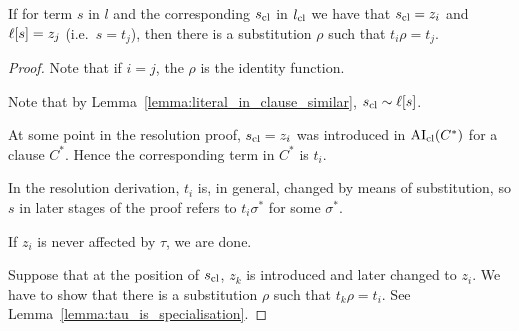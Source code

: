 \documentclass[,%
	paper=a4,%
	DIV12, %
	twoside=false,%
	liststotoc,
	bibtotoc,
	draft=false,%
	numbers=noendperiod
]{scrartcl}
\begin{document}
\cbstart
\begin{lemma}
	\label{lemma:literal_in_clause_similar_strenghtened}
	If for term $s$ in $l$ and the corresponding $s_\mathrm{cl}$ in $l_\mathrm{cl}$ we have that $s_\mathrm{cl} = z_i$ and $\ell[s] = z_j$ (i.e.\ $s=t_j$),
	then there is a substitution $\rho$ such that $t_i\rho = t_j$.
\end{lemma} 
\begin{proof}
	Note that if $i=j$, the $\rho$ is the identity function.

	Note that by Lemma~\ref{lemma:literal_in_clause_similar}, $s_\mathrm{cl} \sim \ell[s]$.

	At some point in the resolution proof, $s_\mathrm{cl} = z_i$ was introduced in $\operatorname{AI}_\mathrm{cl}(C^*)$ for a clause $C^*$. 
	Hence the corresponding term in $C^*$ is $t_i$.

	In the resolution derivation, $t_i$ is, in general, changed by means of substitution, so $s$ in later stages of the proof refers to $t_i\sigma^*$ for some $\sigma^*$.

	If $z_i$ is never affected by $\tau$, we are done.

	Suppose that at the position of $s_\mathrm{cl}$, $z_k$ is introduced and later changed to $z_i$.
	We have to show that there is a substitution $\rho$ such that $t_k\rho = t_i$.
	See Lemma~\ref{lemma:tau_is_specialisation}.
\end{proof}
\cbend
\end{document}
